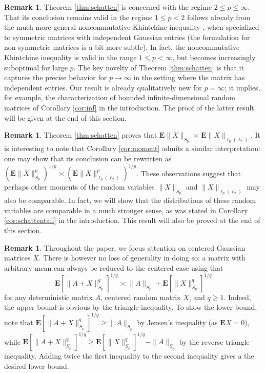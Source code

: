 \documentclass[10pt,reqno]{amsart}
\theoremstyle{definition}
\newtheorem{rem}[thm]{Remark}
\numberwithin{equation}{section}
\numberwithin{figure}{section}
\numberwithin{table}{section}
\begin{document}
\begin{rem}
Theorem \ref{thm:schatten} is concerned with the regime $2\le p\le\infty$. 
That its conclusion remains valid in the regime $1\le p<2$ follows already 
from the much more general noncommutative Khintchine inequality 
\cite[section 6]{PX03}, when specialized to symmetric matrices with 
independent Gaussian entries (the formulation for non-symmetric matrices 
is a bit more subtle). In fact, the noncommutative Khintchine 
inequality is valid in the range $1\le p<\infty$, but becomes increasingly 
suboptimal for large $p$. The key novelty of Theorem \ref{thm:schatten} is 
that it captures the precise behavior for $p\to\infty$ in the setting
where the matrix has independent entries. Our result is already
qualitatively new for $p=\infty$; it implies, for example, the
characterization of bounded infinite-dimensional random matrices of
Corollary \ref{cor:inf} in the introduction. The proof of the latter 
result will be given at the end of this section.
\end{rem}

\begin{rem}
Theorem \ref{thm:schatten} proves that $\mathbf{E}\|X\|_{S_p}\asymp 
\mathbf{E}\|X\|_{\ell_p(\ell_2)}$. It is interesting to note that 
Corollary \ref{cor:moment} admits a similar interpretation: one may show 
that its conclusion can be rewritten as 
$(\mathbf{E}\|X\|_{S_p}^p)^{1/p}\asymp(\mathbf{E}\|X\|_{\ell_p(\ell_2)}^p)^{1/p}$. 
These observations suggest that perhaps other moments of the random 
variables $\|X\|_{S_p}$ and $\|X\|_{\ell_p(\ell_2)}$ may also be 
comparable. In fact, we will show that the distributions of these random 
variables are comparable in a much stronger sense, as was stated 
in Corollary \ref{cor:schattentail} in the introduction. This result
will also be proved at the end of this section.
\end{rem}

\begin{rem}
\label{rem:nonzeromean}
Throughout the paper, we focus attention on centered Gaussian 
matrices $X$. There is however no loss of generality in doing so:
a matrix with arbitrary mean can always be reduced to the centered case
using that
$$
        \mathbf{E}[\|A+X\|_{S_p}^q]^{1/q} \asymp \|A\|_{S_p} +
        \mathbf{E}[\|X\|_{S_p}^q]^{1/q}
$$
for any deterministic matrix $A$, centered random matrix $X$, and $q\ge 1$. 
Indeed, the upper bound is obvious by the triangle inequality. To show the
lower bound, note that $\mathbf{E}[\|A+X\|_{S_p}^q]^{1/q}\ge\|A\|_{S_p}$ 
by Jensen's inequality (as $\mathbf{E}X=0$), while
$\mathbf{E}[\|A+X\|_{S_p}^q]^{1/q}\ge\mathbf{E}[\|X\|_{S_p}^q]^{1/q}-
\|A\|_{S_p}$ by the reverse triangle inequality. Adding twice the first 
inequality to the second inequality gives a the desired lower bound.
\end{rem}
\end{document}
